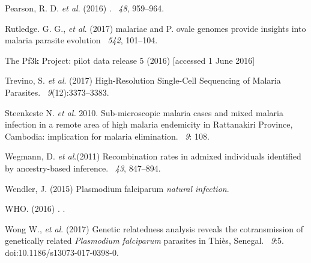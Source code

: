 \documentclass[9pt,lineno]{elife}
\begin{document}
\begin{thebibliography}{}
Pearson, R. D. {\em et al}. (2016)
.
~{\em 48}, 959--964.

Rutledge. G. G., {\em et al}. (2017)
 malariae and P. ovale genomes provide insights into malaria parasite evolution
~{\em 542}, 101--104.

The Pf3k Project: pilot data release 5 (2016)
 [accessed 1 June 2016]

Trevino, S. {\em et al}. (2017)
\newblock High-Resolution Single-Cell Sequencing of Malaria Parasites.
~{\em 9}(12):3373--3383.


Steenkeste N. {\em et al.} 2010.
\newblock Sub-microscopic malaria cases and
mixed malaria infection in a remote area of high malaria endemicity in Rattanakiri Province, Cambodia: implication for
malaria elimination.
~{\em 9}: 108.

Wegmann, D. {\em et al}.(2011)
\newblock Recombination rates in admixed individuals identified by ancestry-based inference.
~{\em 43\/}, 847--894.

Wendler, J. (2015)
 {P}lasmodium falciparum {\em natural infection}.

WHO. (2016)
.
.

Wong W., {\em et al}. (2017)
\newblock Genetic relatedness analysis reveals the cotransmission of genetically related {\it Plasmodium falciparum} parasites in Thiès, Senegal.
~{\em 9}:5. doi:10.1186/s13073-017-0398-0.


\end{thebibliography}
\end{document}
